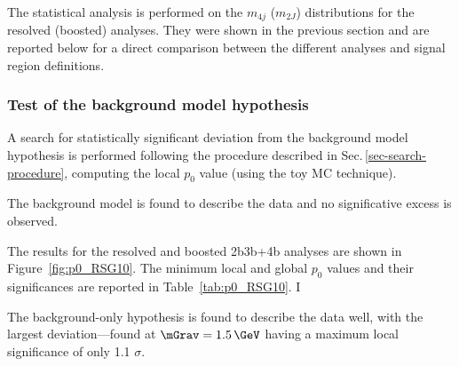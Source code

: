 The statistical analysis is performed on the $m_{4j}$ ($m_{2J}$) distributions for the
resolved (boosted) analyses. They were shown in the previous section and are reported
below for a direct comparison between the different analyses and signal region
definitions.
%
%

\subsubsection{Test of the background model hypothesis}

A search for statistically significant deviation from the background model hypothesis is
performed following the procedure described in Sec.\,\ref{sec-search-procedure}, computing the
local $p_0$ value (using the toy MC technique).

The background model is found to describe the data and no significative excess is observed.

The results for the resolved and boosted 2b3b+4b analyses are shown in Figure~\ref{fig:p0_RSG10}.
The minimum local and global $p_0$ values and their significances are reported in Table~\ref{tab:p0_RSG10}.
I

The background-only hypothesis is found to describe the data well, with the largest deviation---found at $\mGrav=1.5\,\GeV$ having a maximum local significance of only 1.1 $\sigma$.

